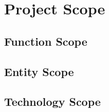 \chapter{Project Scope}

\section{Function Scope}

\section{Entity Scope}

\section{Technology Scope}